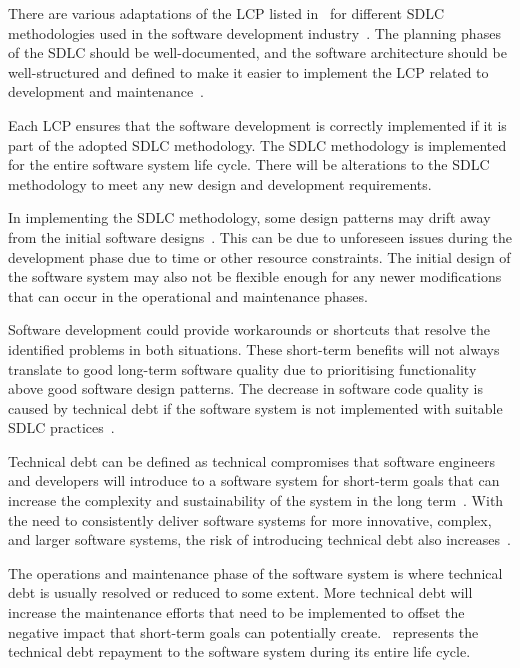 There are various adaptations of the LCP listed in~ for different SDLC methodologies used in the software development industry~\cite{Al-Saiyd2015}. The planning phases of the SDLC should be well-documented, and the software architecture should be well-structured and defined to make it easier to implement the LCP related to development and maintenance~\cite{Ackermann2009}.\par Each LCP ensures that the software development is correctly implemented if it is part of the adopted SDLC methodology. The SDLC methodology is implemented for the entire software system life cycle. There will be alterations to the SDLC methodology to meet any new design and development requirements. \par In implementing the SDLC methodology, some design patterns may drift away from the initial software designs~\cite{Reimanis2016}. This can be due to unforeseen issues during the development phase due to time or other resource constraints. The initial design of the software system may also not be flexible enough for any newer modifications that can occur in the operational and maintenance phases. \par Software development could provide workarounds or shortcuts that resolve the identified problems in both situations. These short-term benefits will not always translate to good long-term software quality due to prioritising functionality above good software design patterns. The decrease in software code quality is caused by technical debt if the software system is not implemented with suitable SDLC practices~\cite{DeLeon-Sigg2020, Reimanis2016}. \par Technical debt can be defined as technical compromises that software engineers and developers will introduce to a software system for short-term goals that can increase the complexity and sustainability of the system in the long term~\cite{Snipes2018, Gralha2018}. With the need to consistently deliver software systems for more innovative, complex, and larger software systems, the risk of introducing technical debt also increases~\cite{Reimanis2016, Khan2013}. \par The operations and maintenance phase of the software system is where technical debt is usually resolved or reduced to some extent. More technical debt will increase the maintenance efforts that need to be implemented to offset the negative impact that short-term goals can potentially create.~ represents the technical debt repayment to the software system during its entire life cycle.

